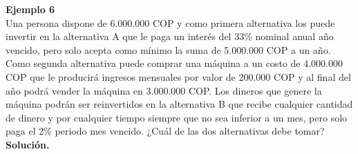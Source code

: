 \newpage
\textbf{Ejemplo 6}\\
Una persona dispone de 6.000.000 COP y como primera alternativa los puede invertir en la alternativa A que le paga un interés del 33\% nominal anual año vencido, pero solo acepta como mínimo la suma de  5.000.000 COP a un año. Como segunda alternativa puede comprar una máquina a un costo de  4.000.000 COP que le producirá ingresos mensuales por valor de  200.000 COP y al final del año podrá vender la máquina en  3.000.000 COP. Los dineros que genere la máquina podrán ser reinvertidos en la alternativa B que recibe cualquier cantidad de dinero y por cualquier tiempo siempre que no sea inferior a un mes, pero solo paga el 2\% periodo mes vencido. ¿Cuál de las dos alternativas debe tomar?
\\


\textbf{Solución.}\\

